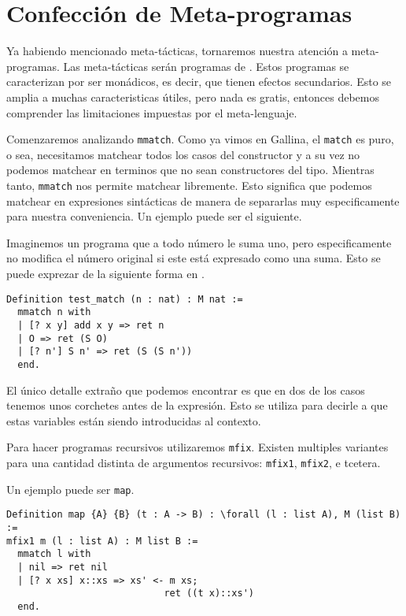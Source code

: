 \section{Confección de Meta-programas}

Ya habiendo mencionado meta-tácticas, tornaremos nuestra atención a meta-programas. Las meta-tácticas serán programas de \Mtac. Estos programas se caracterizan por ser monádicos, es decir, que tienen efectos secundarios. Esto se amplia a muchas caracteristicas útiles, pero nada es gratis, entonces debemos comprender las limitaciones impuestas por el meta-lenguaje.

Comenzaremos analizando \lstinline{mmatch}. Como ya vimos en Gallina, el \lstinline{match} es puro, o sea, necesitamos matchear todos los casos del constructor y a su vez no podemos matchear en terminos que no sean constructores del tipo. Mientras tanto, \lstinline{mmatch} nos permite matchear libremente. Esto significa que podemos matchear en expresiones sintácticas de manera de separarlas muy especificamente para nuestra conveniencia. Un ejemplo puede ser el siguiente.

Imaginemos un programa que a todo número le suma uno, pero especificamente no modifica el número original si este está expresado como una suma. Esto se puede exprezar de la siguiente forma en \Mtac.
\begin{lstlisting}
Definition test_match (n : nat) : M nat :=
  mmatch n with
  | [? x y] add x y => ret n
  | O => ret (S O)
  | [? n'] S n' => ret (S (S n'))
  end.
\end{lstlisting}

El único detalle extraño que podemos encontrar es que en dos de los casos tenemos unos corchetes antes de la expresión. Esto se utiliza para decirle a \Mtac que estas variables están siendo introducidas al contexto.

Para hacer programas recursivos utilizaremos \lstinline{mfix}. Existen multiples variantes para una cantidad distinta de argumentos recursivos: \lstinline{mfix1}, \lstinline{mfix2}, e
tcetera.

Un ejemplo puede ser \lstinline{map}.
\begin{lstlisting}
Definition map {A} {B} (t : A -> B) : \forall (l : list A), M (list B) :=
mfix1 m (l : list A) : M list B :=
  mmatch l with
  | nil => ret nil
  | [? x xs] x::xs => xs' <- m xs;
                            ret ((t x)::xs')
  end.
\end{lstlisting}

